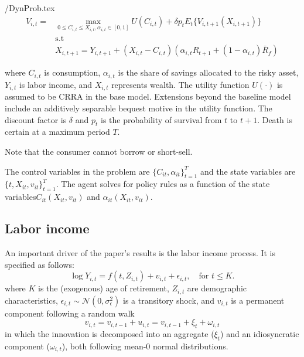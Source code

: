 \documentclass[./CGMPortfolio.tex]{subfiles}
\begin{document}
\begin{verbatimwrite}{\EqDir/DynProb.tex}
	\begin{align}
		V_{i,t} =& \max_{0\leq C_{i,t} \leq X_{i,t}, \alpha_{i,t}\in[0,1]} U(C_{i,t}) + \delta p_t E_t\{ V_{i,t+1} (X_{i,t+1}) \}\\
		&\text{s.t} \nonumber \\
		&X_{i,t+1} = Y_{i,t+1} + (X_{i,t} - C_{i,t})(\alpha_{i,t} R_{t+1} + (1-\alpha_{i,t})\bar{R}_f)
	\end{align}
\end{verbatimwrite}

where $C_{i,t}$ is consumption, $\alpha_{i,t}$ is the share of savings 
allocated to the risky asset, $Y_{i,t}$ is labor income, and $X_{i,t}$ 
represents wealth. The utility function $U(\cdot)$ is assumed to be CRRA in the 
base model. Extensions beyond the baseline model include an additively 
separable bequest motive in the utility function. The discount factor is 
$\delta$ and $p_t$ is the probability of survival from $t$ to $t+1$. Death is 
certain at a maximum period $T$.

Note that the consumer cannot borrow or short-sell.

The control variables in the problem are $\{C_{it}, \alpha_{it}\}^T_{t=1}$ and the state variables are $\{t, X_{it}, v_{it} \}^T_{t=1}$. The agent solves for  policy rules as a function of the state variables\textemdash $C_{it}(X_{it}, v_{it})$ and $\alpha_{it}(X_{it}, v_{it})$.

\subsection{Labor income}

An important driver of the paper's results is the labor income process. It is 
specified as follows:
\begin{equation}
\log Y_{i,t} = f(t,Z_{i,t}) + v_{i,t} + \epsilon_{i,t}, \quad \text{for } t\leq K.
\end{equation}
where $K$ is the (exogenous) age of retirement, $Z_{i,t}$ are demographic 
characteristics, $\epsilon_{i,t}\sim \mathcal{N}(0,\sigma^2_\epsilon)$ is a 
transitory shock, and  $v_{i,t}$ is a permanent component following a random 
walk
\begin{equation}
v_{i,t} = v_{i,t-1} + u_{i,t} = v_{i,t-1} + \xi_t + \omega_{i,t}
\end{equation}
in which the innovation is decomposed into an aggregate ($\xi_t$) and an 
idiosyncratic component ($\omega_{i,t}$), both following mean-0 normal 
distributions.
\end{document}
